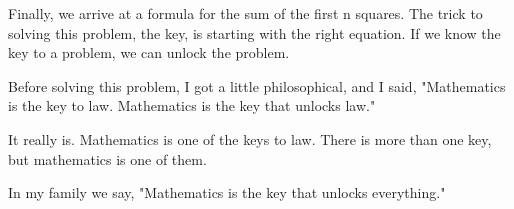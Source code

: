 Finally, we arrive at a formula for the sum of the first n squares. The trick to solving this problem, the key, is starting with the right equation. If we know the key to a problem, we can unlock the problem.

Before solving this problem, I got a little philosophical, and I said, "Mathematics is the key to law. Mathematics is the key that unlocks law."

It really is. Mathematics is one of the keys to law. There is more than one key, but mathematics is one of them.

In my family we say, "Mathematics is the key that unlocks everything."
